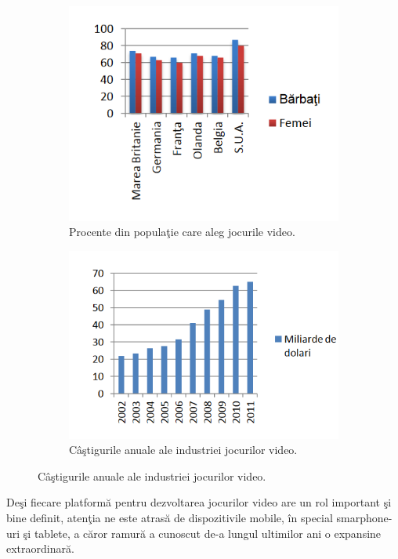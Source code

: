 \documentclass{article}
\begin{document}
\begin{figure}[h!]
  \begin{subfigure}{0.45\linewidth}
    \includegraphics[scale=0.62]{fig1.png}
    \caption{Procente din popula\c{t}ie care aleg jocurile video.\footnotemark[1]}
  \end{subfigure}
  \begin{subfigure}{0.45\linewidth}
    \includegraphics[scale=0.62]{fig2.png}
    \caption{C\^{a}\c{s}tigurile anuale ale industriei jocurilor video.}
  \end{subfigure}
\end{figure}


	De\c{s}i fiecare platform\u{a} pentru dezvoltarea jocurilor video are un rol important \c{s}i bine definit, aten\c{t}ia ne este atras\u{a} de dispozitivile mobile, \^{i}n special smarphone-uri \c{s}i tablete, a c\u{a}ror ramur\u{a} a cunoscut de-a lungul ultimilor ani o expansine extraordinar\u{a}.
\end{document}
